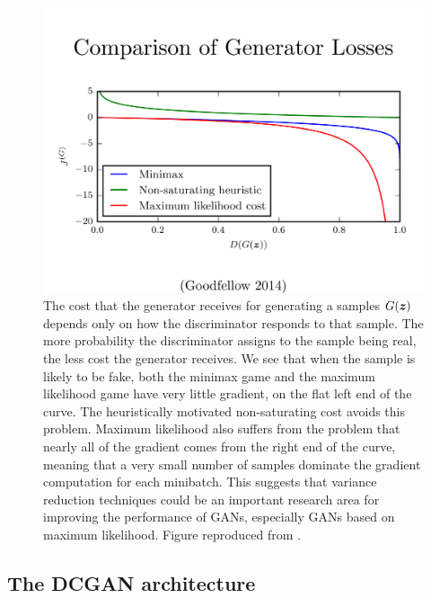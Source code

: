 \begin{figure}
\centering
\includegraphics[width=\figwidth]{comparison}
\caption{
  The cost that the generator receives for generating a samples $G({\bm{z}})$ depends only on
  how the discriminator responds to that sample.
  The more probability the discriminator assigns to the sample being real, the less cost
  the generator receives.
  We see that when the sample is likely to be fake, both the minimax game and the maximum
  likelihood game have very little gradient, on the flat left end of the curve.
  The heuristically motivated non-saturating cost avoids this problem.
  Maximum likelihood also suffers from the problem that nearly all of the gradient comes
  from the right end of the curve, meaning that a very small number of samples dominate
  the gradient computation for each minibatch.
  This suggests that variance reduction techniques could be an important research area
  for improving the performance of GANs, especially GANs based on maximum likelihood.
  Figure reproduced from \citet{Goodfellow-ICLR2015}.
}
\label{fig:comparison}
\end{figure}



\subsection{The DCGAN architecture}

